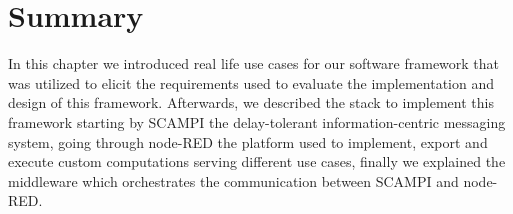 \section{Summary}

In this chapter we introduced real life use cases for our software framework that was utilized to elicit the requirements used to evaluate the implementation and design of this framework. Afterwards, we described the stack  to implement this framework starting by SCAMPI the  delay-tolerant information-centric messaging system, going through node-RED the platform used to implement, export and execute custom computations serving different use cases, finally we explained the middleware which orchestrates the communication between SCAMPI and node-RED.